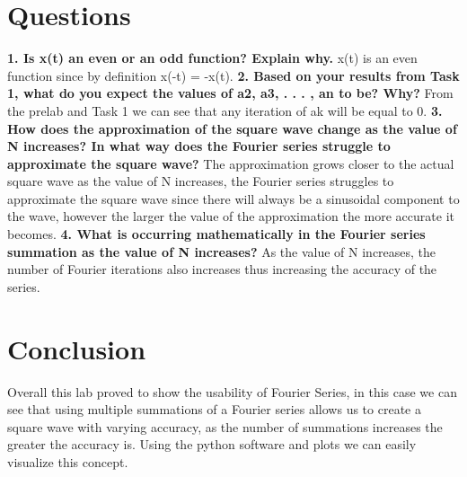 \documentclass[12pt]{report}
\begin{document}
\section{Questions}
\textbf{1. Is x(t) an even or an odd function? Explain why.}\newline
x(t) is an even function since by definition x(-t) = -x(t).\newline\newline
\textbf{2. Based on your results from Task 1, what do you expect the values of a2, a3, . . . , an to be?
Why?} \newline
From the prelab and Task 1 we can see that any iteration of ak will be equal to 0. \newline\newline
\textbf{3. How does the approximation of the square wave change as the value of N increases? In what
way does the Fourier series struggle to approximate the square wave?}\newline 
The approximation grows closer to the actual square wave as the value of N increases, the Fourier series struggles to approximate the square wave since there will always be a sinusoidal component to the wave, however the larger the value of the approximation the more accurate it becomes. \newline\newline
\textbf{4. What is occurring mathematically in the Fourier series summation as the value of N increases?}\newline
As the value of N increases, the number of Fourier iterations also increases thus increasing the accuracy of the series. 

\section{Conclusion}
Overall this lab proved to show the usability of Fourier Series, in this case we can see that using multiple summations of a Fourier series allows us to create a square wave with varying accuracy, as the number of summations increases the greater the accuracy is. Using the python software and plots we can easily visualize this concept. 
\newpage
\end{document}
